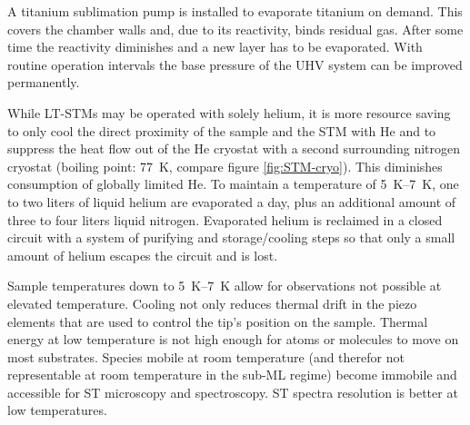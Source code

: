 A titanium sublimation pump is installed to evaporate titanium on demand. This covers the chamber walls and, due to its reactivity, binds residual gas. After some time the reactivity diminishes and a new layer has to be evaporated. With routine operation intervals the base pressure of the UHV system can be improved permanently.

While LT-STMs may be operated with solely helium, it is more resource saving to only cool the direct proximity of the sample and the STM with He and to suppress the heat flow out of the He cryostat with a second surrounding nitrogen cryostat (boiling point: \SI{77}{\K}, compare figure \ref{fig:STM-cryo}). This diminishes consumption of globally limited He. To maintain a temperature of \SIrange{5}{7}{\K}, one to two liters of liquid helium are evaporated a day, plus an additional amount of three to four liters liquid nitrogen. Evaporated helium is reclaimed in a closed circuit with a system of purifying and storage/cooling steps so that only a small amount of helium escapes the circuit and is lost.

Sample temperatures down to \SIrange{5}{7}{\K} allow for observations not possible at elevated temperature. Cooling not only reduces thermal drift in the piezo elements that are used to control the tip's position on the sample. Thermal energy at low temperature is not high enough for atoms or molecules to move on most substrates. Species mobile at room temperature (and therefor not representable at room temperature in the sub-ML regime) become immobile and accessible for ST microscopy and spectroscopy. ST spectra resolution is better at low temperatures.

